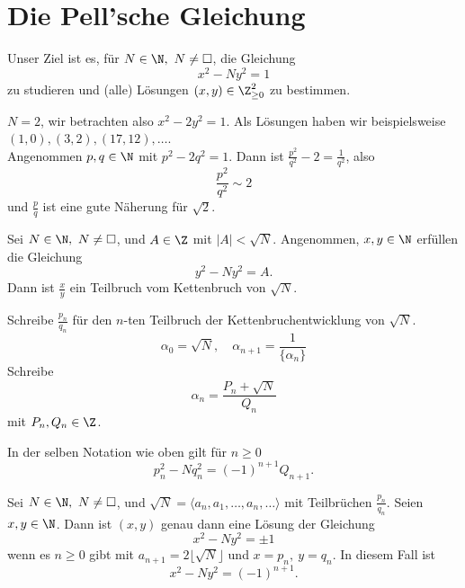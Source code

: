 \chapter{Die Pell'sche Gleichung}

Unser Ziel ist es, für $N \in \N,\ N \neq \square$, die Gleichung
\[ x^2-Ny^2=1 \]
zu studieren und (alle) Lösungen $(x,y)\in \Z_{\geq0}^2$ zu bestimmen.

\begin{exmp*}
	$N=2$, wir betrachten also $x^2-2y^2=1$. Als Lösungen haben wir beispielsweise $(1,0),(3,2),(17,12),\dotsc$.\\
	Angenommen $p,q \in \N$ mit $p^2-2q^2=1$. Dann ist $\frac{p^2}{q^2} - 2 = \frac{1}{q^2}$, also 
	\[ \frac{p^2}{q^2} \sim 2 \]
	und $\frac{p}{q}$ ist eine gute Näherung für $\sqrt{2}$.
\end{exmp*}

\begin{thm}\autolabel
	Sei $N \in \N,\ N \neq \square$, und $A \in \Z$ mit $|A| < \sqrt{N}$. Angenommen, $x,y \in \N$ erfüllen die Gleichung 
	\[ y^2-Ny^2=A. \]
	Dann ist $\frac{x}{y}$ ein Teilbruch vom Kettenbruch von $\sqrt{N}$.
\end{thm}

\begin{notat*}
	Schreibe $\frac{p_n}{q_n}$ für den $n$-ten Teilbruch der Kettenbruchentwicklung von $\sqrt{N}$.
	\[ \alpha_0 = \sqrt{N},\quad \alpha_{n+1} = \frac{1}{\{\alpha_n\}} \]
	Schreibe
	\[ \alpha_n = \frac{P_n + \sqrt{N}}{Q_n} \]
	mit $P_n,Q_n \in \Z$.
\end{notat*}

\begin{thm}\autolabel
	In der selben Notation wie oben gilt für $n \geq 0$
	\[ p_n^2-Nq_n^2 = (-1)^{n+1} Q_{n+1}. \]
\end{thm}

\begin{thm}\autolabel
	Sei $N \in \N,\ N \neq \square$, und $\sqrt{N} = \langle a_n,a_1,\dotsc,a_n,\dotsc\rangle$ mit Teilbrüchen $\frac{p_n}{q_n}$. Seien $x,y \in \N$. Dann ist $(x,y)$ genau dann eine Lösung der Gleichung
	\[ x^2-Ny^2=\pm 1 \]
	wenn es $n \geq 0$ gibt mit $a_{n+1} = 2 \lfloor \sqrt{N} \rfloor$ und $x=p_n,\ y=q_n$. In diesem Fall ist
	\[ x^2-Ny^2 = (-1)^{n+1}. \]
\end{thm}